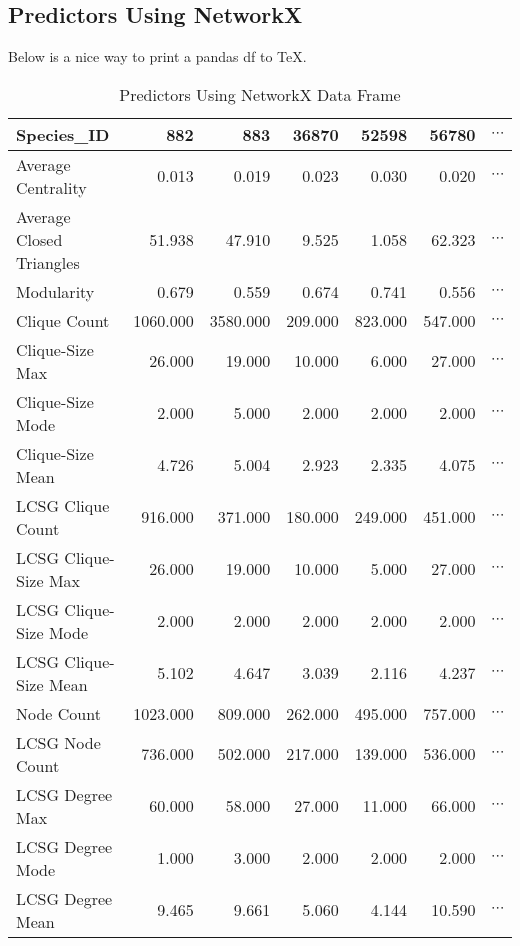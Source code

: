 \documentclass[12pt]{article}
\begin{document}
\subsection{Predictors Using NetworkX}
Below is a nice way to print a pandas df to TeX.
\begin{table}[H]
\centering
\caption{Predictors Using NetworkX Data Frame}
\begin{tabular}{lrrrrrr}
\toprule
Species\_ID &     882   &     883   &    36870 &    52598 &    56780  & $\cdots$\\
\midrule
Average Centrality       &     0.013 &     0.019 &    0.023 &    0.030 &    0.020 & $\cdots$\\
Average Closed Triangles &    51.938 &    47.910 &    9.525 &    1.058 &   62.323 & $\cdots$\\
Modularity               &     0.679 &     0.559 &    0.674 &    0.741 &    0.556 & $\cdots$\\
Clique Count             &  1060.000 &  3580.000 &  209.000 &  823.000 &  547.000 & $\cdots$\\
Clique-Size Max          &    26.000 &    19.000 &   10.000 &    6.000 &   27.000 & $\cdots$\\
Clique-Size Mode         &     2.000 &     5.000 &    2.000 &    2.000 &    2.000 & $\cdots$\\
Clique-Size Mean         &     4.726 &     5.004 &    2.923 &    2.335 &    4.075 & $\cdots$\\
LCSG Clique Count        &   916.000 &   371.000 &  180.000 &  249.000 &  451.000 & $\cdots$\\
LCSG Clique-Size Max     &    26.000 &    19.000 &   10.000 &    5.000 &   27.000 & $\cdots$\\
LCSG Clique-Size Mode    &     2.000 &     2.000 &    2.000 &    2.000 &    2.000 & $\cdots$\\
LCSG Clique-Size Mean    &     5.102 &     4.647 &    3.039 &    2.116 &    4.237 & $\cdots$\\
Node Count               &  1023.000 &   809.000 &  262.000 &  495.000 &  757.000 & $\cdots$\\
LCSG Node Count          &   736.000 &   502.000 &  217.000 &  139.000 &  536.000 & $\cdots$\\
LCSG Degree Max          &    60.000 &    58.000 &   27.000 &   11.000 &   66.000 & $\cdots$\\
LCSG Degree Mode         &     1.000 &     3.000 &    2.000 &    2.000 &    2.000 & $\cdots$\\
LCSG Degree Mean         &     9.465 &     9.661 &    5.060 &    4.144 &   10.590 & $\cdots$\\
\bottomrule
\end{tabular}
\end{table}
\end{document}
